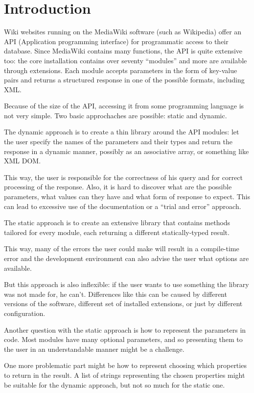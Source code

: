 \chapter*{Introduction}

Wiki websites running on the MediaWiki software (such as Wikipedia) offer an API (Application programming interface)
for programmatic access to their database.
Since MediaWiki contains many functions, the API is quite extensive too: the core installation contains over seventy ``modules''
and more are available through extensions. Each module accepts parameters in the form of key-value pairs
and returns a structured response in one of the possible formats, including XML.

Because of the size of the API, accessing it from some programming language is not very simple.
Two basic approchaches are possible: static and dynamic.

The dynamic approach is to create a thin library around the API modules:
let the user specify the names of the parameters and their types and return the response
in a dynamic manner, possibly as an associative array, or something like XML DOM.

This way, the user is responsible for the correctness of his query and for correct processing
of the response.
Also, it is hard to discover what are the possible parameters, what values can they have
and what form of response to expect.
This can lead to excessive use of the documentation or a ``trial and error'' approach.

The static approach is to create an extensive library that contains methods tailored for every module,
each returning a different statically-typed result.

This way, many of the errors the user could make will result in a compile-time error
and the development environment can also advise the user what options are available.

But this approach is also inflexible: if the user wants to use something the library
was not made for, he can't.
Differences like this can be caused by different versions of the software,
different set of installed extensions, or just by different configuration.

Another question with the static approach is how to represent the parameters in code.
Most modules have many optional parameters, and so presenting them to the user
in an understandable manner might be a challenge.

One more problematic part might be how to represent choosing which properties to return in the result.
A list of strings representing the chosen properties might be suitable for the dynamic approach, but not so much for the static one.

